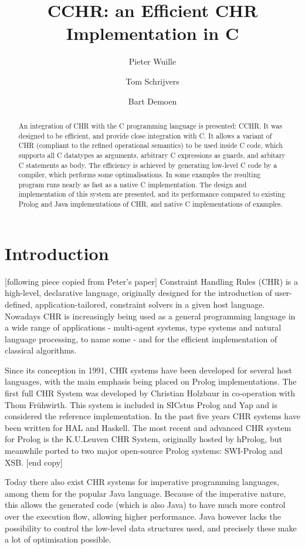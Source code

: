 \documentclass{llncs}
\title{CCHR: an Efficient CHR Implementation in C}
\author{Pieter Wuille \and Tom Schrijvers \and Bart Demoen}
\institute{Department of Computer Science, K.U.Leuven, Belgium}
\begin{document}
\maketitle

\begin{abstract}
An integration of CHR with the C programming language is presented: CCHR.
It was designed to be efficient, and provide close integration with C.
It allows a variant of CHR (compliant to the refined operational semantics)
to be used inside C code, which supports all C datatypes as arguments, arbitrary
C expressions as guards, and arbitary C statements as body.
The efficiency is achieved by generating low-level C code by a compiler, 
which performs some optimalisations. In some examples the resulting program
runs nearly as fast as a native C implementation.
The design and implementation of this system are presented, and its performance
compared to existing Prolog and Java implementations of CHR, and native C
implementations of examples.
\end{abstract}

\section{Introduction}

[following piece copied from Peter's paper] Constraint Handling Rules (CHR) is a
high-level, declarative language, originally designed for the introduction of
user-defined, application-tailored, constraint solvers in a given host language.
Nowadays CHR is increasingly being used as a general programming language in a
wide range of applications - multi-agent systems, type systems and natural
language processing, to name some - and for the efficient implementation of
classical algorithms.

Since its conception in 1991, CHR systems have been developed for several host
languages, with the main emphasis being placed on Prolog implementations.
The first full CHR System was developed by Christian Holzbaur in co-operation
with Thom Fr\"uhwirth. This system is included in SICstus Prolog and Yap and is
considered the reference implementation. In the past five years CHR systems have
been written for HAL and Haskell. The most recent and advanced CHR system for
Prolog is the K.U.Leuven CHR System, originally hosted by hProlog, but
meanwhile ported to two major open-source Prolog systems: SWI-Prolog and XSB.
[end copy]

Today there also exist CHR systems for imperative programming
languages, among them for the popular Java language. Because of the imperative
nature, this allows the generated code (which is also Java) to have much more
control over the execution flow, allowing higher performance. Java however lacks
the possibility to control the low-level data structures used, and precisely these
make a lot of optimisation possible.
\end{document}
